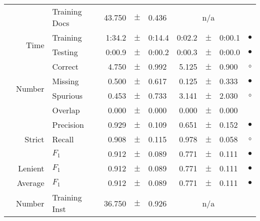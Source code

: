 \begin{longtable}{|r|r|l||rcl|rcl|c|}
\cline{3-10} &                             &   Training Docs &      43.750 &  $\pm$  &       0.436 &    \multicolumn{3}{c|}{n/a}         &  \\
\cline{2-10} & \multirow{2}{*}{      Time} &        Training &      1:34.2 &  $\pm$  &      0:14.4 &      0:02.2 &  $\pm$  &      0:00.1 & $\bullet$ \\
\cline{3-10} &                             &         Testing &      0:00.9 &  $\pm$  &      0:00.2 &      0:00.3 &  $\pm$  &      0:00.0 & $\bullet$ \\
\hline
\pagebreak
\hline
\hline
\multirow{11}{*}{\begin{sideways}start\end{sideways} }
             & \multirow{4}{*}{    Number} &         Correct &       4.750 &  $\pm$  &       0.992 &       5.125 &  $\pm$  &       0.900 & $\circ$ \\
\cline{3-10} &                             &         Missing &       0.500 &  $\pm$  &       0.617 &       0.125 &  $\pm$  &       0.333 & $\bullet$ \\
\cline{3-10} &                             &        Spurious &       0.453 &  $\pm$  &       0.733 &       3.141 &  $\pm$  &       2.030 & $\circ$ \\
\cline{3-10} &                             &         Overlap &       0.000 &  $\pm$  &       0.000 &       0.000 &  $\pm$  &       0.000 &  \\
\cline{2-10} & \multirow{3}{*}{    Strict} &       Precision &       0.929 &  $\pm$  &       0.109 &       0.651 &  $\pm$  &       0.152 & $\bullet$ \\
\cline{3-10} &                             &          Recall &       0.908 &  $\pm$  &       0.115 &       0.978 &  $\pm$  &       0.058 & $\circ$ \\
\cline{3-10} &                             &           $F_1$ &       0.912 &  $\pm$  &       0.089 &       0.771 &  $\pm$  &       0.111 & $\bullet$ \\
\cline{2-10} &                     Lenient &           $F_1$ &       0.912 &  $\pm$  &       0.089 &       0.771 &  $\pm$  &       0.111 & $\bullet$ \\
\cline{2-10} &                     Average &           $F_1$ &       0.912 &  $\pm$  &       0.089 &       0.771 &  $\pm$  &       0.111 & $\bullet$ \\
\cline{2-10} & \multirow{2}{*}{    Number} &   Training Inst &      36.750 &  $\pm$  &       0.926 &    \multicolumn{3}{c|}{n/a}         &  \\

\end{longtable}
